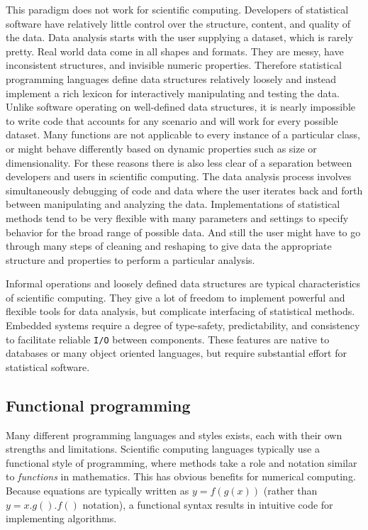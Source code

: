 This paradigm does not work for scientific computing. Developers of statistical software have relatively little control over the structure, content, and quality of the data. Data analysis starts with the user supplying a dataset, which is rarely pretty. Real world data come in all shapes and formats. They are messy, have inconsistent structures, and invisible numeric properties. Therefore statistical programming languages define data structures relatively loosely and instead implement a rich lexicon for interactively manipulating and testing the data. Unlike software operating on well-defined data structures, it is nearly impossible to write code that accounts for any scenario and will work for every possible dataset. Many functions are not applicable to every instance of a particular class, or might behave differently based on dynamic properties such as size or dimensionality. For these reasons there is also less clear of a separation between developers and users in scientific computing. The data analysis process involves simultaneously debugging of code and data where the user iterates back and forth between manipulating and analyzing the data. Implementations of statistical methods tend to be very flexible with many parameters and settings to specify behavior for the broad range of possible data. And still the user might have to go through many steps of cleaning and reshaping to give data the appropriate structure and properties to perform a particular analysis. 

Informal operations and loosely defined data structures are typical characteristics of scientific computing. They give a lot of freedom to implement powerful and flexible tools for data analysis, but complicate interfacing of statistical methods. Embedded systems require a degree of type-safety, predictability, and consistency to facilitate reliable \texttt{I/O} between components. These features are native to databases or many object oriented languages, but require substantial effort for statistical software. 


\subsection{Functional programming}

Many different programming languages and styles exists, each with their own strengths and limitations. Scientific computing languages typically use a functional style of programming, where methods take a role and notation similar to \emph{functions} in mathematics. This has obvious benefits for numerical computing. Because equations are typically written as $y = f(g(x))$ (rather than $y = x.g().f()$ notation), a functional syntax results in intuitive code for implementing algorithms. 

